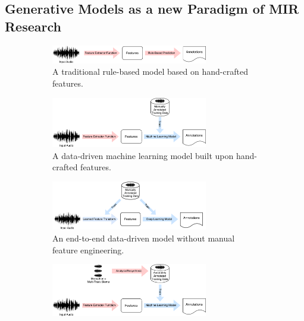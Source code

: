 \subsection{Generative Models as a new Paradigm of MIR Research}

\begin{figure}
	\begin{subfigure}[b]{\textwidth}
		\centering
		\includegraphics[width=0.75\textwidth]{paradigms-1-manual.pdf}
		\caption{A traditional rule-based model based on hand-crafted features.}
		\label{}
	\end{subfigure}
	\begin{subfigure}[b]{\textwidth}
		\centering
		\vspace{1em}
		\includegraphics[width=0.75\textwidth]{paradigms-2-features.pdf}
		\caption{A data-driven machine learning model built upon hand-crafted features.}
		\label{}
	\end{subfigure}
	\begin{subfigure}[b]{\textwidth}
		\centering
		\vspace{1em}
		\includegraphics[width=0.75\textwidth]{paradigms-3-end-to-end.pdf}
		\caption{An end-to-end data-driven model without manual feature engineering.}
		\label{}
	\end{subfigure}
	\begin{subfigure}[b]{\textwidth}
		\centering
		\vspace{1em}
		\includegraphics[width=0.75\textwidth]{paradigms-4-analysis-synthesis.pdf}

\end{subfigure}
\end{figure}
